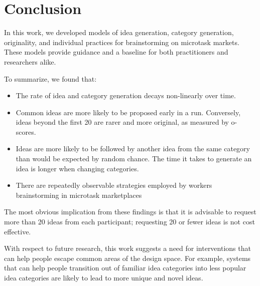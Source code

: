 

\section{Conclusion}

In this work, we developed models of idea generation, category generation, originality, and individual practices for brainstorming on microtask markets. These models provide guidance and a baseline for both practitioners and researchers alike.

To summarize, we found that:

\begin{itemize}
\item The rate of idea and category generation decays non-linearly over time. 
\item Common ideas are more likely to be proposed early in a run. Conversely, ideas beyond the first 20 are rarer and more original, as measured by o-scores. %
\item Ideas are more likely to be followed by another idea from the same category than would be expected by random chance. The time it takes to generate an idea is longer when changing categories.
\item There are repeatedly observable strategies employed by workers brainstorming in microtask marketplaces
\end{itemize}

The most obvious implication from these findings is that it is advisable to request more than 20 ideas from each participant; requesting 20 or fewer ideas is not cost effective.

With respect to future research, this work suggests a need for interventions that can help people escape common areas of the design space. For example, systems that can help people transition out of familiar idea categories into less popular idea categories are likely to lead to more unique and novel ideas.
